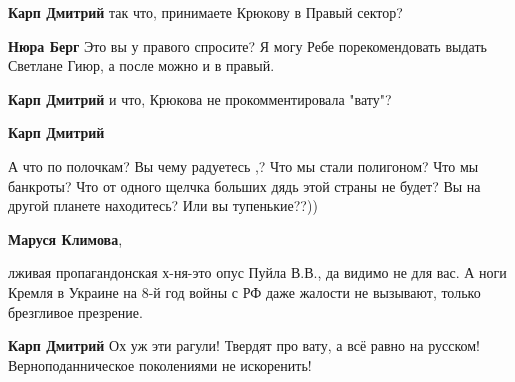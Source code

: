 \begin{itemize}
\begin{itemize}
 

\textbf{Карп Дмитрий} так что, принимаете Крюкову в Правый сектор?

 

\textbf{Нюра Берг} Это вы у правого спросите? Я могу Ребе порекомендовать выдать Светлане Гиюр, а после можно и в правый.

 
\textbf{Карп Дмитрий} и что, Крюкова не прокомментировала "вату"?

 
\textbf{Карп Дмитрий} 

А что по полочкам? Вы чему радуетесь ,? Что мы стали полигоном? Что мы банкроты?
Что от одного щелчка больших дядь этой страны не будет? Вы на другой планете
находитесь? Или вы тупенькие??))


 
\textbf{Маруся Климова}, 

лживая пропагандонская х-ня-это опус Пуйла В.В., да видимо не для вас. А ноги
Кремля в Украине на 8-й год войны с РФ даже жалости не вызывают, только
брезгливое презрение.


 
\textbf{Карп Дмитрий} Ох уж эти рагули! Твердят про вату, а всё равно на русском! Верноподанническое поколениями не искоренить!


\end{itemize}
\end{itemize}
